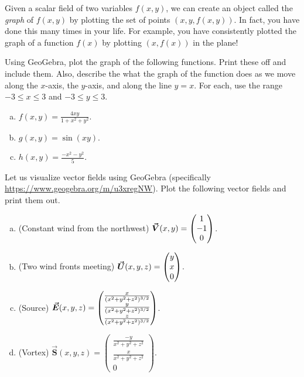 \documentclass[12pt]{article} %
\begin{document}
\begin{problem}
Given a scalar field of two variables $f(x,y)$, we can create an object called the \emph{graph} of $f(x,y)$ by plotting the set of points $(x,y,f(x,y))$. In fact, you have done this many times in your life. For example, you have consistently plotted the graph of a function $f(x)$ by plotting $(x,f(x))$ in the plane!  

Using GeoGebra, plot the graph of the following functions. Print these off and include them.  Also, describe the what the graph of the function does as we move along the $x$-axis, the $y$-axis, and along the line $y=x$. For each, use the range $-3\leq x \leq 3$ and $-3\leq y \leq 3$.
\begin{enumerate}[(a)]
	\item $f(x,y) = \frac{4xy}{1+x^2+y^2}$.
	\item $g(x,y) = \sin(xy)$.
	\item $h(x,y) = \frac{-x^2-y^2}{5}$.
\end{enumerate}
\end{problem}

\begin{problem} 
Let us visualize vector fields using GeoGebra (specifically \url{https://www.geogebra.org/m/u3xregNW}). Plot the following vector fields and print them out. 
\begin{enumerate}[(a)]
    \item (Constant wind from the northwest) $\boldsymbol{\vec{V}}(x,y)=\begin{pmatrix} 1 \\ -1 \\ 0\end{pmatrix}$.
    \item (Two wind fronts meeting) $\boldsymbol{\vec{U}}(x,y,z)=\begin{pmatrix} y \\ x \\ 0 \end{pmatrix}$.
    \item (Source) $\boldsymbol{\vec{E}}(x,y,z) = \begin{pmatrix} \frac{x}{(x^2+y^2+z^2)^{3/2}} \\ \frac{y}{(x^2+y^2+z^2)^{3/2}} \\ \frac{z}{(x^2+y^2+z^2)^{3/2}} \end{pmatrix}$.
    \item (Vortex) $\boldsymbol{\vec{S}}(x,y,z)=\begin{pmatrix} \frac{-y}{x^2+y^2+z^2} \\ \frac{x}{x^2+y^2+z^2} \\ 0\end{pmatrix}.$           
\end{enumerate}
\end{problem}
\end{document}
